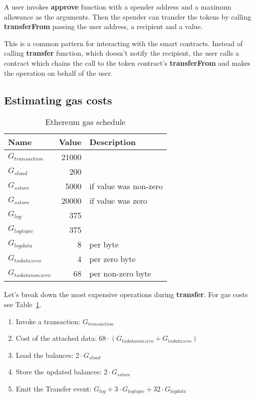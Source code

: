 \documentclass[12pt]{article}
\begin{document}
A user invokes \textbf{approve} function with a spender address and a maximum allowance as the arguments.
Then the spender can transfer the tokens by calling \textbf{transferFrom} passing the user address, a recipient and a value.

This is a common pattern for interacting with the smart contracts.
Instead of calling \textbf{transfer} function, which doesn't notify the recipient, the user calls a contract which chains the call to the token contract's \textbf{transferFrom} and makes the operation on behalf of the user.

\subsection{Estimating gas costs}

\begin{table}[h]
\caption{Ethereum gas schedule\cite{yellowpaper}}
\label{gas-costs}
\begin{center}
\begin{tabular}{l r l}
	Name & Value & Description \\ \hline
	$G_{transaction}$ & 21000 \\
	$G_{sload}$ & 200 \\
	$G_{sstore}$ & 5000 & if value was non-zero \\
	$G_{sstore}$ & 20000 & if value was zero \\
	$G_{log}$ & 375 \\
	$G_{logtopic}$ & 375 \\
	$G_{logdata}$ & 8 & per byte \\
	$G_{txdatazero}$ & 4 & per zero byte \\
	$G_{txdatanonzero}$ & 68 & per non-zero byte \\
\end{tabular}
\end{center}
\end{table}
%
Let's break down the most expensive operations during \textbf{transfer}.
For gas costs see Table~\ref{gas-costs}.

\begin{enumerate}
	\item Invoke a transaction: $G_{transaction}$
	\item Cost of the attached data: $68 \cdot (G_{txdatanonzero} + G_{txdatazero})$
	\item Load the balances: $2 \cdot G_{sload}$
	\item Store the updated balances: $2 \cdot G_{sstore}$
	\item Emit the Transfer event: $G_{log} + 3 \cdot G_{logtopic} + 32 \cdot G_{logdata}$
\end{enumerate}
\end{document}
